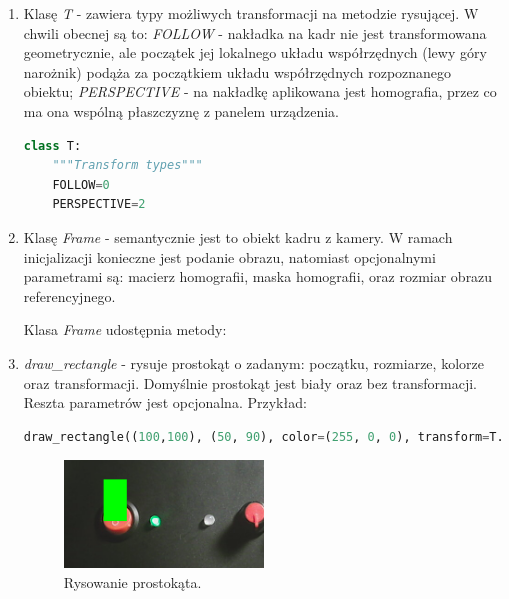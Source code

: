 \documentclass[12pt,twoside,polish]{article}
\begin{document}
\begin{enumerate}[label=\alph*), leftmargin=1.25cm]
\item Klasę \emph{T} - zawiera typy możliwych transformacji na metodzie rysującej. W chwili obecnej są to: \emph{FOLLOW} - nakładka na kadr nie jest transformowana geometrycznie, ale początek jej lokalnego układu współrzędnych (lewy góry narożnik) podąża za początkiem układu współrzędnych rozpoznanego obiektu; \emph{PERSPECTIVE} - na nakładkę aplikowana jest homografia, przez co ma ona wspólną płaszczyznę z panelem urządzenia.

\begin{lstlisting}[language=Python]
class T:
	"""Transform types"""
	FOLLOW=0
	PERSPECTIVE=2
\end{lstlisting}

\item Klasę \emph{Frame} - semantycznie jest to obiekt kadru z kamery. W ramach inicjalizacji konieczne jest podanie obrazu, natomiast opcjonalnymi parametrami są: macierz homografii, maska homografii, oraz rozmiar obrazu referencyjnego.

Klasa \emph{Frame} udostępnia metody:

\item \emph{draw\_rectangle} - rysuje prostokąt o zadanym: początku, rozmiarze, kolorze oraz transformacji. Domyślnie prostokąt jest biały oraz bez transformacji. Reszta parametrów jest opcjonalna. Przykład:
\begin{lstlisting}[language=Python]
draw_rectangle((100,100), (50, 90), color=(255, 0, 0), transform=T.PERSPECTIVE)
\end{lstlisting}
\begin{figure}[h]
	\centering
	\includegraphics[width=0.5\textwidth]{draw_rect}
	\caption{Rysowanie prostokąta.}
\end{figure}


\end{enumerate}
\end{document}
